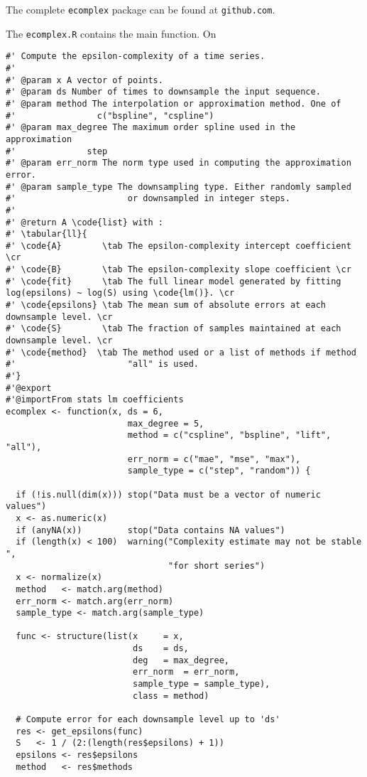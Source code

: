 The complete \texttt{ecomplex} package can be found at 
\texttt{github.com\nateaff\ecomplex}. 

The \texttt{ecomplex.R} contains the main function. On

\begin{verbatim}
#' Compute the epsilon-complexity of a time series.
#'
#' @param x A vector of points. 
#' @param ds Number of times to downsample the input sequence.
#' @param method The interpolation or approximation method. One of
#'                c("bspline", "cspline")
#' @param max_degree The maximum order spline used in the approximation
#'              step
#' @param err_norm The norm type used in computing the approximation error.
#' @param sample_type The downsampling type. Either randomly sampled  
#'                      or downsampled in integer steps.
#'
#' @return A \code{list} with :
#' \tabular{ll}{
#' \code{A}        \tab The epsilon-complexity intercept coefficient \cr
#' \code{B}        \tab The epsilon-complexity slope coefficient \cr
#' \code{fit}      \tab The full linear model generated by fitting log(epsilons) ~ log(S) using \code{lm()}. \cr
#' \code{epsilons} \tab The mean sum of absolute errors at each downsample level. \cr
#' \code{S}        \tab The fraction of samples maintained at each downsample level. \cr
#' \code{method}  \tab The method used or a list of methods if method 
#'                      "all" is used. 
#'}
#'@export
#'@importFrom stats lm coefficients
ecomplex <- function(x, ds = 6, 
                        max_degree = 5,
                        method = c("cspline", "bspline", "lift", "all"), 
                        err_norm = c("mae", "mse", "max"), 
                        sample_type = c("step", "random")) {

  if (!is.null(dim(x))) stop("Data must be a vector of numeric values")
  x <- as.numeric(x)  
  if (anyNA(x))         stop("Data contains NA values")
  if (length(x) < 100)  warning("Complexity estimate may not be stable ", 
                                "for short series")  
  x <- normalize(x)
  method   <- match.arg(method)
  err_norm <- match.arg(err_norm) 
  sample_type <- match.arg(sample_type)

  func <- structure(list(x     = x, 
                         ds    = ds, 
                         deg   = max_degree, 
                         err_norm  = err_norm, 
                         sample_type = sample_type),
                         class = method)

  # Compute error for each downsample level up to 'ds'
  res <- get_epsilons(func)  
  S   <- 1 / (2:(length(res$epsilons) + 1))
  epsilons <- res$epsilons
  method   <- res$methods


\end{verbatim}
